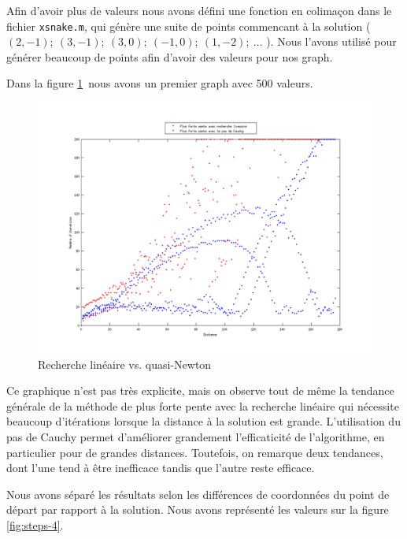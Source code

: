 \documentclass[11pt,a4paper,twoside,onecolumn,titlepage]{report}
\begin{document}
\begin{enumerate}[(a)]
Afin d'avoir plus de valeurs nous avons défini une fonction en colimaçon dans le fichier \texttt{xsnake.m}, qui génère une suite de points commencant à la solution ( $(2,-1);\ (3,-1);\ (3,0);\ (-1,0);\ (1,-2);\ \ldots$ ). Nous l'avons utilisé pour générer beaucoup de points afin d'avoir des valeurs pour nos graph.

Dans la figure \ref{rlVSqn}\ nous avons un premier graph avec 500 valeurs.

\begin{figure}[h!]
	\centering
	\includegraphics[scale=0.9]{steps-allinone}
	\caption{Recherche linéaire vs. quasi-Newton}
	\label{rlVSqn}
\end{figure}




Ce graphique n'est pas très explicite, mais on observe tout de même la tendance générale de la méthode de plus forte pente avec la recherche linéaire qui nécessite beaucoup d'itérations lorsque la distance à la solution est grande. L'utilisation du pas de Cauchy permet d'améliorer grandement l'efficaticité de l'algorithme, en particulier pour de grandes distances. Toutefois, on remarque deux tendances, dont l'une tend à être inefficace tandis que l'autre reste efficace.



Nous avons séparé les résultats selon les différences de coordonnées du point de départ par rapport à la solution. Nous avons représenté les valeurs sur la figure \ref{fig:steps-4}.


\end{enumerate}
\end{document}
